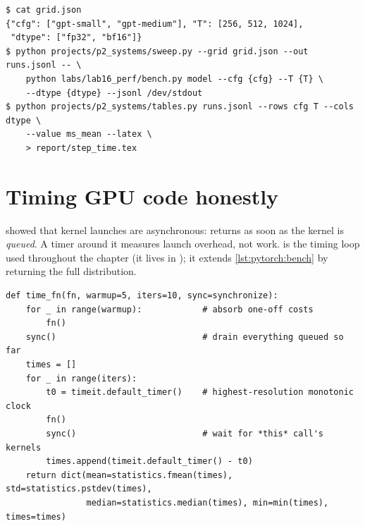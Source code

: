 \begin{lstlisting}[style=shell,caption={A sweep from grid to LaTeX table.},label={lst:perf:sweep}]
$ cat grid.json
{"cfg": ["gpt-small", "gpt-medium"], "T": [256, 512, 1024],
 "dtype": ["fp32", "bf16"]}
$ python projects/p2_systems/sweep.py --grid grid.json --out runs.jsonl -- \
    python labs/lab16_perf/bench.py model --cfg {cfg} --T {T} \
    --dtype {dtype} --jsonl /dev/stdout
$ python projects/p2_systems/tables.py runs.jsonl --rows cfg T --cols dtype \
    --value ms_mean --latex \
    > report/step_time.tex
\end{lstlisting}

\section{Timing GPU code honestly}\label{sec:perf:timing}

 showed that kernel launches are asynchronous: 
returns as soon as the kernel is \emph{queued}. A timer around it measures launch overhead, not
work. \Cref{lst:perf:timefn} is the timing loop used throughout the chapter (it lives in
); it extends \cref{lst:pytorch:bench} by returning the full distribution.

\begin{lstlisting}[caption={Warm up, synchronise, repeat, keep every sample.},label={lst:perf:timefn}]
def time_fn(fn, warmup=5, iters=10, sync=synchronize):
    for _ in range(warmup):            # absorb one-off costs
        fn()
    sync()                             # drain everything queued so far
    times = []
    for _ in range(iters):
        t0 = timeit.default_timer()    # highest-resolution monotonic clock
        fn()
        sync()                         # wait for *this* call's kernels
        times.append(timeit.default_timer() - t0)
    return dict(mean=statistics.fmean(times), std=statistics.pstdev(times),
                median=statistics.median(times), min=min(times), times=times)
\end{lstlisting}

